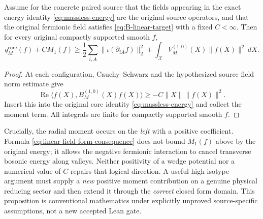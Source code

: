 \begin{proposition}\label{prop:linear-field-core-bound}
Assume for the concrete paired source that the fields appearing
in the exact energy identity \eqref{eq:massless-energy} are the
original source operators, and that the original fermionic field
satisfies \eqref{eq:B-linear-target} with a fixed $C<\infty$.
Then for every original compactly supported smooth $f$,
\begin{equation}\label{eq:linear-field-form-consequence}
 q_M^{\mathrm{core}}(f)+C M_1(f)
 \ge \frac12\sum_{i,A}\|\iota(\partial_{iA}f)\|_2^2
 +\int_{\mathcal X}V_M^{(1,0)}(X)\|f(X)\|^2\,dX.
\end{equation}
\end{proposition}
\begin{proof}
At each configuration, Cauchy--Schwarz and the hypothesized
source field norm estimate give
\[
 \operatorname{Re}\langle f(X),B_M^{(1,0)}(X)f(X)\rangle
 \ge -C\|X\|\|f(X)\|^2.
\]
Insert this into the original core identity
\eqref{eq:massless-energy} and collect the moment term.
All integrals are finite for compactly supported smooth $f$.
\end{proof}
Crucially, the radial moment occurs on the \emph{left} with a
positive coefficient. Formula \eqref{eq:linear-field-form-consequence}
does not bound $M_1(f)$ above by the original energy; it allows
the negative fermionic interaction to cancel transverse bosonic
energy along valleys. Neither positivity of a wedge potential
nor a numerical value of $C$ repairs that logical direction.
A useful high-isotype argument must supply a \emph{new} positive
moment contribution on a genuine physical reducing sector
and then extend it through the \emph{correct} closed form domain.
This proposition is conventional mathematics under explicitly
unproved source-specific assumptions, not a new accepted Lean gate.


